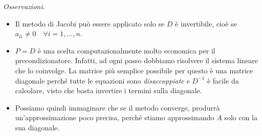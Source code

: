 \textit{Osservazioni.}
\begin{itemize}
\item Il metodo di Jacobi può essere applicato solo se $D$ è invertibile, cioè se $a_{ii} \neq 0\quad \forall i=1,\dotsc ,n$.
\item $P=D$ è una scelta computazionalmente molto economica per il precondizionatore.
Infatti, ad ogni passo dobbiamo risolvere il sistema lineare che lo coinvolge.
La matrice più semplice possibile per questo è una matrice diagonale perché tutte le equazioni sono \textit{disaccoppiate} e $D^{-1}$ è facile da calcolare, visto che basta invertire i termini sulla diagonale.
\item Possiamo quindi immaginare che se il metodo converge, produrrà un'approssimazione poco precisa, perché stiamo approssimando $A$ solo con la sua diagonale.
\end{itemize}
